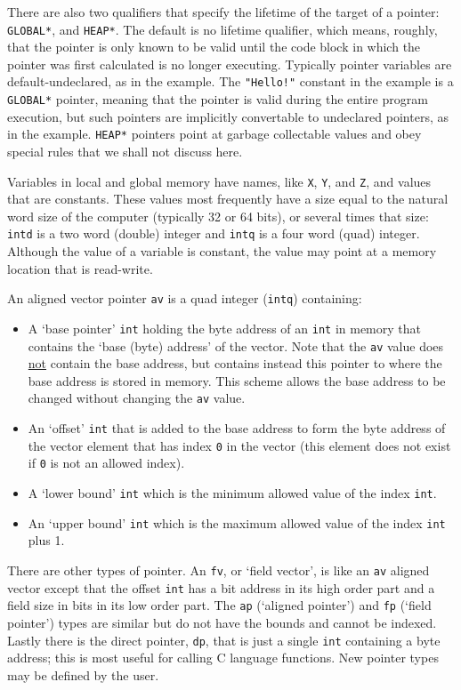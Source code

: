 \documentclass[12pt]{article}
\begin{document}
There are also two qualifiers that specify the lifetime of the target
of a pointer: {\tt *GLOBAL*}, and {\tt *HEAP*}.  The
default is no lifetime qualifier,
which means, roughly, that the pointer is only known to be valid until
the code block in which the pointer was first calculated is no
longer executing.  Typically pointer variables are default-undeclared,
as in the example.  The {\tt "Hello!"} constant in the example is
a {\tt *GLOBAL*} pointer, meaning that the pointer is valid during the
entire program execution, but such pointers are implicitly convertable
to undeclared pointers, as in the example.  {\tt *HEAP*} pointers
point at garbage collectable values and obey special rules that we
shall not discuss here.

Variables in local and global memory
have names, like {\tt X}, {\tt Y}, and {\tt Z}, and values
that are constants.
These values most frequently
have a size equal to the natural
word size of the computer (typically 32 or 64 bits), or
several times that size: {\tt intd} is a two word (double) integer
and {\tt intq} is a four word (quad) integer.
Although the value of a variable is constant, the value may point
at a memory location that is read-write.

An aligned vector pointer {\tt av} is a
quad integer ({\tt intq}) containing:
\begin{itemize}
\item A `base pointer' {\tt int} holding the byte address
of an {\tt int} in memory
that contains the `base (byte) address' of the vector.
Note that the {\tt av} value does \underline{not} contain
the base address, but contains instead this pointer to where
the base address is stored in memory.  This scheme allows
the base address to be changed without changing the {\tt av} value.
\item An `offset' {\tt int} that is added to the base address
to form the byte address of the vector element
that has index {\tt 0} in the vector (this element does not
exist if {\tt 0} is not an allowed index).
\item A `lower bound' {\tt int} which is the minimum allowed
value of the index {\tt int}.
\item An `upper bound' {\tt int} which is the maximum allowed
value of the index {\tt int} plus 1.
\end{itemize}

There are other types of pointer.  An {\tt fv}, or `field vector',
is like an {\tt av} aligned
vector except that the offset {\tt int} has a bit address in its
high order part and a field size in bits in its low order part.
The {\tt ap} (`aligned pointer') and {\tt fp} (`field pointer')  types are
similar but do not have the bounds and cannot be indexed.  Lastly
there is the direct pointer, {\tt dp}, that is just a single {\tt int}
containing a byte address; this is most useful for calling
C language functions.
New pointer types may be defined by the user.
\end{document}
